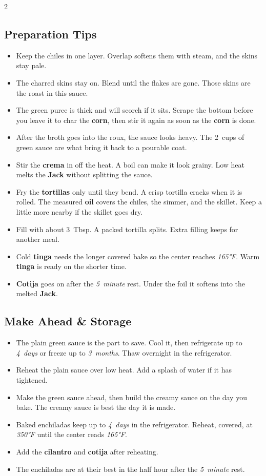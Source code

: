 \documentclass[11pt,letterpaper]{article}
\begin{document}
{\begin{multicols}{2}
\subsection*{Preparation Tips}
\begin{itemize}
    \item Keep the chiles in one layer. Overlap softens them with steam, and the skins stay pale.
    \item The charred skins stay on. Blend until the flakes are gone. Those skins are the roast in this sauce.
    \item The green puree is thick and will scorch if it sits. Scrape the bottom before you leave it to char the \textbf{corn}, then stir it again as soon as the \textbf{corn} is done.
    \item After the broth goes into the roux, the sauce looks heavy. The 2~cups of green sauce are what bring it back to a pourable coat.
    \item Stir the \textbf{crema} in off the heat. A boil can make it look grainy. Low heat melts the \textbf{Jack} without splitting the sauce.
    \item Fry the \textbf{tortillas} only until they bend. A crisp tortilla cracks when it is rolled. The measured \textbf{oil} covers the chiles, the simmer, and the skillet. Keep a little more nearby if the skillet goes dry.
    \item Fill with about 3~Tbsp. A packed tortilla splits. Extra filling keeps for another meal.
    \item Cold \textbf{tinga} needs the longer covered bake so the center reaches \textit{165°F}. Warm \textbf{tinga} is ready on the shorter time.
    \item \textbf{Cotija} goes on after the \textit{5~minute} rest. Under the foil it softens into the melted \textbf{Jack}.
\end{itemize}

\subsection*{Make Ahead \& Storage}
\begin{itemize}
    \item The plain green sauce is the part to save. Cool it, then refrigerate up to \textit{4~days} or freeze up to \textit{3~months}. Thaw overnight in the refrigerator.
    \item Reheat the plain sauce over low heat. Add a splash of water if it has tightened.
    \item Make the green sauce ahead, then build the creamy sauce on the day you bake. The creamy sauce is best the day it is made.
    \item Baked enchiladas keep up to \textit{4~days} in the refrigerator. Reheat, covered, at \textit{350°F} until the center reads \textit{165°F}.
    \item Add the \textbf{cilantro} and \textbf{cotija} after reheating.
    \item The enchiladas are at their best in the half hour after the \textit{5~minute} rest.
\end{itemize}


\end{multicols}}
\end{document}
